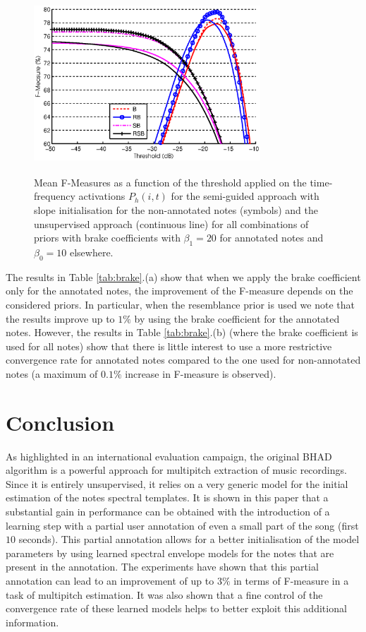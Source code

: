 \documentclass{article}
\begin{document}
\begin{figure}[!ht]
\begin{minipage}[b]{1.0\linewidth}
  \centering
  \centerline{\includegraphics[width=8.5cm,height=6.7cm]{figures/finalbrake.eps}}
\end{minipage}
\caption{Mean F-Measures as a function of the threshold applied on the time-frequency activations $P_h(i,t)$ for the semi-guided approach with slope initialisation for the non-annotated notes (symbols) and the unsupervised approach (continuous line) for all combinations of priors with brake coefficients with $\beta_1=20$ for annotated notes and $\beta_0=10$ elsewhere.}
\label{fig:fxt-brake}
\end{figure}


The results in Table \ref{tab:brake}.(a) show that when we apply the brake coefficient only for the annotated notes, the improvement of the F-measure depends on the considered priors. In particular, when the resemblance prior is used we note that the results improve up to $1\%$ by using the brake coefficient for the annotated notes. However, the results in Table \ref{tab:brake}.(b) (where the brake coefficient is used for all notes) show that there is little interest to use a more restrictive convergence rate for annotated notes compared to the one used for non-annotated notes (a maximum of $0.1\%$ increase in F-measure is observed).


\section{Conclusion}
\label{sec:conc}

As highlighted in an international evaluation campaign, the original BHAD algorithm is a powerful approach for multipitch extraction of music recordings. Since it is entirely unsupervised, it relies on a very generic model for the initial estimation of the notes spectral templates.
It is shown in this paper that a substantial gain in performance can be obtained with the introduction of a learning step with a partial user annotation of even a small part of the song (first $ 10$ seconds). This partial annotation allows for a better initialisation of the model parameters by using learned spectral envelope models for the notes that are present in the annotation. The experiments have shown that this partial annotation can lead to an improvement of up to $3\%$ in terms of F-measure in a task of multipitch estimation. It was also shown that a fine control of the convergence rate of these learned models helps to better exploit this additional information.
\end{document}
